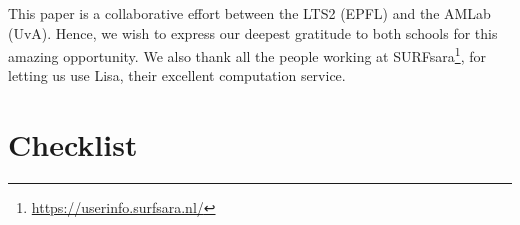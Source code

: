 \documentclass{article}
\begin{document}

\begin{ack}
This paper is a collaborative effort between the LTS2 (EPFL) and the AMLab (UvA). Hence, we wish to express our deepest gratitude to both schools for this amazing opportunity. We also thank all the people working at SURFsara\footnote{\url{https://userinfo.surfsara.nl/}}, for letting us use Lisa, their excellent computation service.
\end{ack}

\clearpage



\clearpage
\section*{Checklist}
\end{document}
